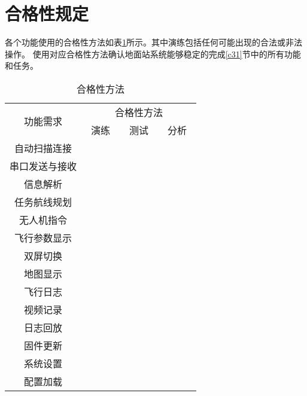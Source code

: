 \section{合格性规定}
各个功能使用的合格性方法如表\ref{t4me}所示。其中演练包括任何可能出现的合法或非法操作。
使用对应合格性方法确认地面站系统能够稳定的完成\ref{c31}节中的所有功能和任务。
\begin{table}[ht]
\centering
\caption{合格性方法}
\label{t4me}
\begin{tabular}{|c|c|c|c|}
\hline
\multirow{2}{*}{功能需求} & \multicolumn{3}{c|}{合格性方法}	\\ \cline{2-4} 
					& ~演练~		& ~测试~		& ~分析~		\\ \hline
自动扫描连接		& \textbullet 	& \textbullet 	& 			 	\\ \hline
串口发送与接收		& 				& \textbullet	& \textbullet	\\ \hline
信息解析			& \textbullet 	& \textbullet 	&				\\ \hline
任务航线规划		& \textbullet 	&				&				\\ \hline
无人机指令			& \textbullet 	& \textbullet	&				\\ \hline
飞行参数显示		& \textbullet 	& 			 	&				\\ \hline
双屏切换			& \textbullet 	&				&				\\ \hline
地图显示			& \textbullet 	&			 	&				\\ \hline
飞行日志			& \textbullet 	& \textbullet 	&				\\ \hline
视频记录			& \textbullet 	&				&				\\ \hline
日志回放			& \textbullet	&				&				\\ \hline
固件更新			& \textbullet	&				&				\\ \hline
系统设置			& \textbullet	& \textbullet	&				\\ \hline
配置加载			& \textbullet	& \textbullet	&				\\ \hline
\end{tabular}
\end{table}

\endinput